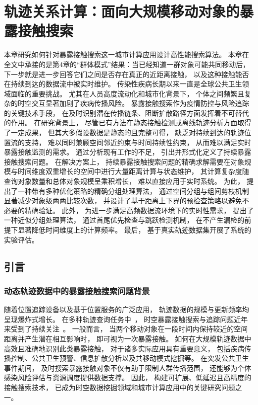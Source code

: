 \chapter{轨迹关系计算：面向大规模移动对象的暴露接触搜索}
\label{cha:contact}
本章研究如何针对暴露接触搜索这一城市计算应用设计高性能搜索算法。 本章在全文中承接的是第4章的“群体模式”结果：当已经知道一群对象可能共同移动后， 下一步就是进一步回答它们之间是否存在真正的近距离接触， 以及这种接触能否在持续到达的数据流中被实时维护。
传染性疾病长期以来一直是全球公共卫生领域面临的重要挑战。 尤其在人员高度流动化和城市化背景下， 个体之间频繁且复杂的时空交互显著加剧了疾病传播风险。 暴露接触搜索作为疫情防控与风险追踪的关键技术手段， 在及时识别潜在传播链条、阻断扩散路径方面发挥着不可替代的作用。 在研究背景上， 尽管已有方法在静态接触检测或离线轨迹分析方面取得了一定成果， 但其大多假设数据是静态的且完整可得， 缺乏对持续到达的轨迹位置流的支持， 难以同时兼顾空间邻近约束与时间持续性约束， 从而难以满足实时暴露接触监测的需求。 通过分析现有工作的不足， 引出并形式化定义了持续暴露接触搜索问题。 在解决方案上， 持续暴露接触搜索问题的精确求解需要在对象规模与时间维度双重增长的空间中进行大量距离计算与状态维护， 其计算复杂度随查询对象数量和总体对象规模呈乘积增长， 难以直接应用于实时系统。 为此， 提出了一种带有多种优化策略的精确分组处理算法， 通过空间分组与组间剪枝机制显著减少对象级两两比较次数， 并设计了基于距离上下界的预检查策略以避免不必要的精确验证。 此外， 为进一步满足高频数据流环境下的实时性需求， 提出了一种近似分组处理算法， 通过首尾优先检查与跳跃检测机制， 在不产生漏检的前提下显著降低时间维度上的计算频率。 最后， 基于真实轨迹数据集开展了系统的实验评估。

\section{引言}

\subsection{动态轨迹数据中的暴露接触搜索问题背景}
随着位置追踪设备以及基于位置服务的广泛应用， 轨迹数据的规模与更新频率均呈现爆炸式增长。 在多种轨迹查询任务中~， 时空暴露接触搜索与追踪问题近年来受到了持续关注~。 一般而言， 当两个移动对象在一段时间内保持较近的空间距离并产生潜在相互影响时， 即可视为一次暴露接触。 如何在大规模轨迹数据中高效且准确地识别此类暴露接触， 对于诸多实际应用具有重要意义， 包括疾病传播控制、公共卫生预警、信息扩散分析以及共移动模式挖掘等。 在突发公共卫生事件期间， 及时搜索暴露接触对象不仅有助于限制人群传播范围， 还能够为个体感染风险评估与资源调度提供数据支撑。 因此， 构建可扩展、低延迟且高精度的接触搜索技术， 已成为时空数据挖掘领域和城市计算应用中的关键研究问题之一。

